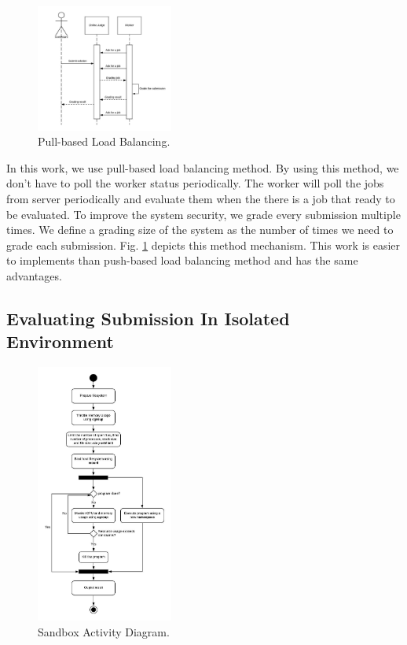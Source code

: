 \documentclass[conference]{IEEEtran}
\begin{document}
\begin{figure}[htbp]
\centerline{\includegraphics[width=0.4\textwidth]{images/paper-pull-based-load-balancing.jpeg}}
\caption{Pull-based Load Balancing.}
\label{pull-based-load-balancing}
\end{figure}

In this work, we use pull-based load balancing method. By using this method, we don't have to poll the worker status periodically. The worker will poll the jobs from server periodically and evaluate them when the there is a job that ready to be evaluated. To improve the system security, we grade every submission multiple times. We define a grading size of the system as the number of times we need to grade each submission. Fig. \ref{pull-based-load-balancing} depicts this method mechanism. This work is easier to implements than push-based load balancing method and has the same advantages.

\subsection{Evaluating Submission In Isolated Environment}

\begin{figure}[htbp]
\centerline{\includegraphics[width=0.4\textwidth]{images/paper-sandbox-activity.jpeg}}
\caption{Sandbox Activity Diagram.}
\label{paper-sandbox-activity}
\end{figure}
\end{document}
